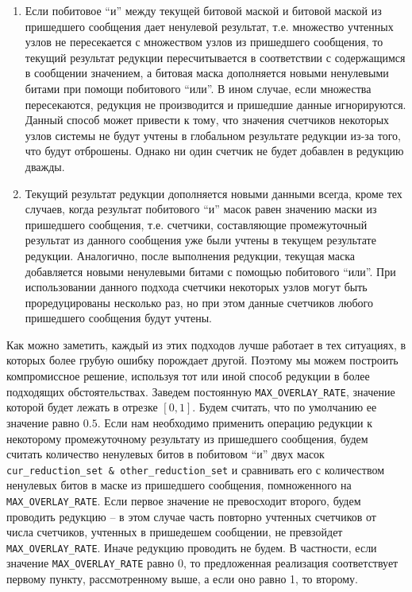\documentclass{article}
\theoremstyle{plain}
\theoremstyle{plain}
\theoremstyle{plain}
\theoremstyle{plain}
\theoremstyle{definition}
\theoremstyle{remark}
\theoremstyle{plain}
\begin{document}
\begin{enumerate}
    \item Если побитовое \enquote{и} между текущей битовой маской и битовой маской из пришедшего сообщения дает ненулевой результат, т.е. множество учтенных узлов не пересекается с множеством узлов из пришедшего сообщения, то текущий результат редукции пересчитывается в соответствии с содержащимся в сообщении значением, а битовая маска дополняется новыми ненулевыми битами при помощи побитового \enquote{или}. В ином случае, если множества пересекаются, редукция не производится и пришедшие данные игнорируются. Данный способ может привести к тому, что значения счетчиков некоторых узлов системы не будут учтены в глобальном результате редукции из-за того, что будут отброшены. Однако ни один счетчик не будет добавлен в редукцию дважды.
    
    \item Текущий результат редукции дополняется новыми данными всегда, кроме тех случаев, когда результат побитового \enquote{и} масок равен значению маски из пришедшего сообщения, т.е. счетчики, составляющие промежуточный результат из данного сообщения уже были учтены в текущем результате редукции. Аналогично, после выполнения редукции, текущая маска добавляется новыми ненулевыми битами с помощью побитового \enquote{или}. При использовании данного подхода счетчики некоторых узлов могут быть проредуцированы несколько раз, но при этом данные счетчиков любого пришедшего сообщения будут учтены.
\end{enumerate}

Как можно заметить, каждый из этих подходов лучше работает в тех ситуациях, в которых более грубую ошибку порождает другой. Поэтому мы можем построить компромиссное решение, используя тот или иной способ редукции в более подходящих обстоятельствах. Заведем постоянную \texttt{MAX\_OVERLAY\_RATE}, значение которой будет лежать в отрезке $[0, 1]$. Будем считать, что по умолчанию ее значение равно $0.5$. Если нам необходимо применить операцию редукции к некоторому промежуточному результату из пришедшего сообщения, будем считать количество ненулевых битов в побитовом \enquote{и} двух масок \texttt{cur\_reduction\_set \& other\_reduction\_set} и сравнивать его с количеством ненулевых битов в маске из пришедшего сообщения, помноженного на \texttt{MAX\_OVERLAY\_RATE}. Если первое значение не превосходит второго, будем проводить редукцию -- в этом случае часть повторно учтенных счетчиков от числа счетчиков, учтенных в пришедешем сообщении, не превзойдет \texttt{MAX\_OVERLAY\_RATE}. Иначе редукцию проводить не будем. В частности, если значение \texttt{MAX\_OVERLAY\_RATE} равно 0, то предложенная реализация соответствует первому пункту, рассмотренному выше, а если оно равно 1, то второму.
\end{document}
